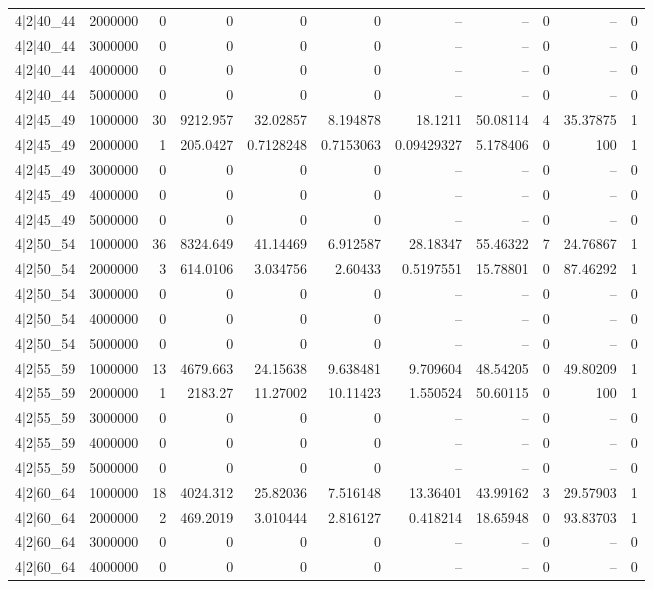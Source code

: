 \begin{tabular}{lrrrrrrrrrr}
4|2|40\_44 & 2000000 & 0 & 0 & 0 & 0 & -- & -- & 0 & -- & 0 \\
4|2|40\_44 & 3000000 & 0 & 0 & 0 & 0 & -- & -- & 0 & -- & 0 \\
4|2|40\_44 & 4000000 & 0 & 0 & 0 & 0 & -- & -- & 0 & -- & 0 \\
4|2|40\_44 & 5000000 & 0 & 0 & 0 & 0 & -- & -- & 0 & -- & 0 \\
4|2|45\_49 & 1000000 & 30 & 9212.957 & 32.02857 & 8.194878 & 18.1211 & 50.08114 & 4 & 35.37875 & 1 \\
4|2|45\_49 & 2000000 & 1 & 205.0427 & 0.7128248 & 0.7153063 & 0.09429327 & 5.178406 & 0 & 100 & 1 \\
4|2|45\_49 & 3000000 & 0 & 0 & 0 & 0 & -- & -- & 0 & -- & 0 \\
4|2|45\_49 & 4000000 & 0 & 0 & 0 & 0 & -- & -- & 0 & -- & 0 \\
4|2|45\_49 & 5000000 & 0 & 0 & 0 & 0 & -- & -- & 0 & -- & 0 \\
4|2|50\_54 & 1000000 & 36 & 8324.649 & 41.14469 & 6.912587 & 28.18347 & 55.46322 & 7 & 24.76867 & 1 \\
4|2|50\_54 & 2000000 & 3 & 614.0106 & 3.034756 & 2.60433 & 0.5197551 & 15.78801 & 0 & 87.46292 & 1 \\
4|2|50\_54 & 3000000 & 0 & 0 & 0 & 0 & -- & -- & 0 & -- & 0 \\
4|2|50\_54 & 4000000 & 0 & 0 & 0 & 0 & -- & -- & 0 & -- & 0 \\
4|2|50\_54 & 5000000 & 0 & 0 & 0 & 0 & -- & -- & 0 & -- & 0 \\
4|2|55\_59 & 1000000 & 13 & 4679.663 & 24.15638 & 9.638481 & 9.709604 & 48.54205 & 0 & 49.80209 & 1 \\
4|2|55\_59 & 2000000 & 1 & 2183.27 & 11.27002 & 10.11423 & 1.550524 & 50.60115 & 0 & 100 & 1 \\
4|2|55\_59 & 3000000 & 0 & 0 & 0 & 0 & -- & -- & 0 & -- & 0 \\
4|2|55\_59 & 4000000 & 0 & 0 & 0 & 0 & -- & -- & 0 & -- & 0 \\
4|2|55\_59 & 5000000 & 0 & 0 & 0 & 0 & -- & -- & 0 & -- & 0 \\
4|2|60\_64 & 1000000 & 18 & 4024.312 & 25.82036 & 7.516148 & 13.36401 & 43.99162 & 3 & 29.57903 & 1 \\
4|2|60\_64 & 2000000 & 2 & 469.2019 & 3.010444 & 2.816127 & 0.418214 & 18.65948 & 0 & 93.83703 & 1 \\
4|2|60\_64 & 3000000 & 0 & 0 & 0 & 0 & -- & -- & 0 & -- & 0 \\
4|2|60\_64 & 4000000 & 0 & 0 & 0 & 0 & -- & -- & 0 & -- & 0 \\

\end{tabular}
